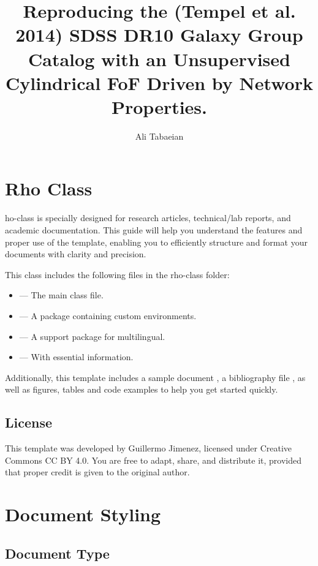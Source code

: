 \documentclass[9pt,a4paper,twocolumn,twoside]{rho-class/rho}
\title{Reproducing the (Tempel et al. 2014) SDSS DR10 Galaxy Group Catalog with an Unsupervised Cylindrical FoF Driven by Network Properties.}
\author[{\textasteriskcentered},a,1]{Ali Tabaeian}
\affil[a]{Dipartimento di Fisica \& Astronomia, Università di Bologna}
\begin{document}
    \maketitle
    \thispagestyle{firststyle}


\section{Rho Class}

    ho-class is specially designed for research articles, technical/lab reports, and academic documentation. This guide will help you understand the features and proper use of the template, enabling you to efficiently structure and format your documents with clarity and precision.

    This class includes the following files in the rho-class folder:
	
	\begin{itemize}
		\item {} — The main class file.
		\item {} — A package containing custom environments.
		\item {} — A support package for multilingual.
		\item {} — With essential information.
	\end{itemize}

    Additionally, this template includes a sample document , a bibliography file , as well as figures, tables and code examples to help you get started quickly.

    \subsection{License}

        This template was developed by Guillermo Jimenez, licensed under Creative Commons CC BY 4.0. You are free to adapt, share, and distribute it, provided that proper credit is given to the original author.

\section{Document Styling}

    \subsection{Document Type}
\end{document}
